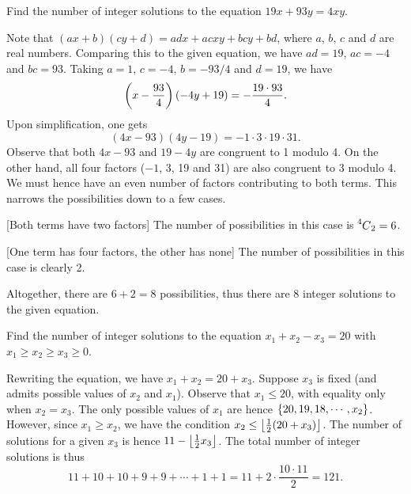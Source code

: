 \begin{question}[8]\label{A::2022-O-1-17}
    Find the number of integer solutions to the equation $19x + 93y = 4xy$.
\end{question}
\begin{solution*}
    Note that $(ax+b)(cy+d) = adx + acxy + bcy + bd$, where $a$, $b$, $c$ and $d$ are real numbers. Comparing this to the given equation, we have $ad = 19$, $ac = -4$ and $bc = 93$. Taking $a = 1$, $c = -4$, $b = -93/4$ and $d = 19$, we have \[\left( x - \frac{93}{4} \right)(-4y + 19) = -\dfrac{19 \cdot 93}{4}.\] Upon simplification, one gets \[(4x - 93)(4y-19) = -1 \cdot 3 \cdot 19 \cdot 31.\] Observe that both $4x - 93$ and $19 - 4y$ are congruent to 1 modulo 4. On the other hand, all four factors ($-1$, 3, 19 and 31) are also congruent to 3 modulo 4. We must hence have an even number of factors contributing to both terms. This narrows the possibilities down to a few cases.

    [Both terms have two factors] The number of possibilities in this case is $\prescript{4\mkern-0.5mu}{}C_{2} = 6$.

    [One term has four factors, the other has none] The number of possibilities in this case is clearly 2.

    Altogether, there are $6 + 2 = 8$ possibilities, thus there are 8 integer solutions to the given equation.
\end{solution*}

\begin{question}[121]\label{A::2022-O-1-18}
    Find the number of integer solutions to the equation $x_1 + x_2 - x_3 = 20$ with $x_1 \geq x_2 \geq x_3 \geq 0$.
\end{question}
\begin{solution*}
    Rewriting the equation, we have $x_1 + x_2 = 20 + x_3$. Suppose $x_3$ is fixed (and admits possible values of $x_2$ and $x_1$). Observe that $x_1 \leq 20$, with equality only when $x_2 = x_3$. The only possible values of $x_1$ are hence $\left\lbrace 20, 19, 18, \cdots, x_2 \right\rbrace$. However, since $x_1 \geq x_2$, we have the condition $x_2 \leq \left\lfloor \frac12 (20 + x_3) \right\rfloor$. The number of solutions for a given $x_3$ is hence $11 - \left\lfloor \frac12 x_3 \right\rfloor$. The total number of integer solutions is thus \[11 + 10 + 10 + 9 + 9 + \cdots + 1 + 1 = 11 + 2 \cdot \frac{10 \cdot 11}{2} = 121.\]
\end{solution*}

